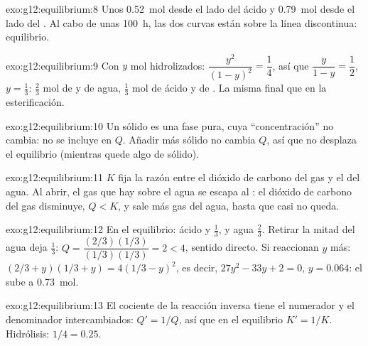 \begin{solution}{exo:g12:equilibrium:8}
Unos \qty{0.52}{mol} desde el lado del ácido y \qty{0.79}{mol} desde el
lado del . Al cabo de unas \qty{100}{h}, las dos curvas están sobre
la línea discontinua: equilibrio.
\end{solution}

\begin{solution}{exo:g12:equilibrium:9}
Con $y$ mol hidrolizados: $\dfrac{y^2}{(1-y)^2} = \dfrac{1}{4}$, así que
$\dfrac{y}{1-y} = \dfrac{1}{2}$, $y = \frac{1}{3}$: $\frac{2}{3}$ mol de
 y de agua, $\frac{1}{3}$ mol de ácido y de . La misma 
final que en la esterificación.
\end{solution}

\begin{solution}{exo:g12:equilibrium:10}
Un sólido es una fase pura, cuya ``concentración'' no cambia: no se
incluye en $Q$. Añadir más sólido no cambia $Q$, así que no desplaza el
equilibrio (mientras quede algo de sólido).
\end{solution}

\begin{solution}{exo:g12:equilibrium:11}
$K$ fija la razón entre el dióxido de carbono del gas y el del agua. Al
abrir, el gas que hay sobre el agua se escapa al : el dióxido de
carbono del gas disminuye, $Q < K$, y sale más gas del agua, hasta que
casi no queda.
\end{solution}

\begin{solution}{exo:g12:equilibrium:12}
En el equilibrio: ácido y  $\frac{1}{3}$,  y agua
$\frac{2}{3}$. Retirar la mitad del agua deja $\frac{1}{3}$:
$Q = \dfrac{(2/3)(1/3)}{(1/3)(1/3)} = 2 < 4$, sentido directo. Si
reaccionan $y$ más: $(2/3 + y)(1/3 + y) = 4(1/3 - y)^2$, es decir,
$27y^2 - 33y + 2 = 0$, $y = 0.064$: el  sube a \qty{0.73}{mol}.
\end{solution}

\begin{solution}{exo:g12:equilibrium:13}
El cociente de la reacción inversa tiene el numerador y el denominador
intercambiados: $Q' = 1/Q$, así que en el equilibrio $K' = 1/K$.
Hidrólisis: $1/4 = 0.25$.
\end{solution}

